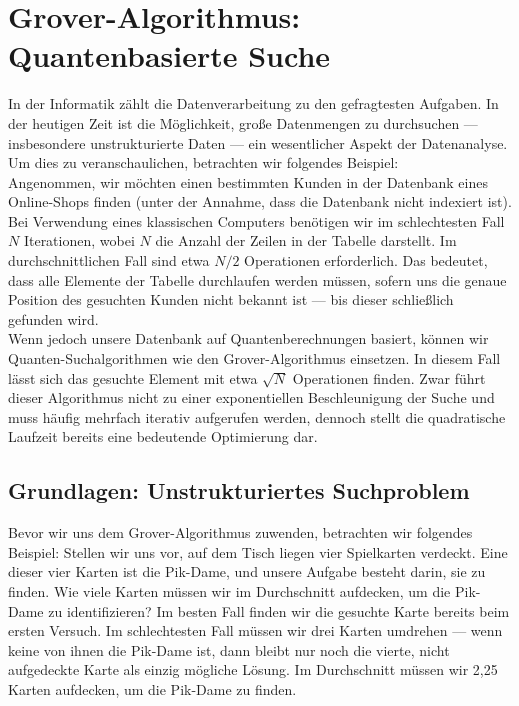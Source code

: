\section{Grover-Algorithmus: Quantenbasierte Suche}
\label{sec:grover-algorithm}
In der Informatik zählt die Datenverarbeitung zu den gefragtesten Aufgaben. In der heutigen Zeit ist die Möglichkeit, große Datenmengen zu durchsuchen — insbesondere unstrukturierte Daten — ein wesentlicher Aspekt der Datenanalyse. Um dies zu veranschaulichen, betrachten wir folgendes Beispiel:\\ 

Angenommen, wir möchten einen bestimmten Kunden in der Datenbank eines Online-Shops finden (unter der Annahme, dass die Datenbank nicht indexiert ist). Bei Verwendung eines klassischen Computers benötigen wir im schlechtesten Fall $N$ Iterationen, wobei $N$ die Anzahl der Zeilen in der Tabelle darstellt. Im durchschnittlichen Fall sind etwa $N/2$ Operationen erforderlich. Das bedeutet, dass alle Elemente der Tabelle durchlaufen werden müssen, sofern uns die genaue Position des gesuchten Kunden nicht bekannt ist — bis dieser schließlich gefunden wird.\\

Wenn jedoch unsere Datenbank auf Quantenberechnungen basiert, können wir Quanten-Suchalgorithmen wie den Grover-Algorithmus einsetzen. In diesem Fall lässt sich das gesuchte Element mit etwa $\sqrt{N}$ Operationen finden. Zwar führt dieser Algorithmus nicht zu einer exponentiellen Beschleunigung der Suche und muss häufig mehrfach iterativ aufgerufen werden, dennoch stellt die quadratische Laufzeit bereits eine bedeutende Optimierung dar.

\subsection{Grundlagen: Unstrukturiertes Suchproblem}
Bevor wir uns dem Grover-Algorithmus zuwenden, betrachten wir folgendes Beispiel: Stellen wir uns vor, auf dem Tisch liegen vier Spielkarten verdeckt. Eine dieser vier Karten ist die Pik-Dame, und unsere Aufgabe besteht darin, sie zu finden. Wie viele Karten müssen wir im Durchschnitt aufdecken, um die Pik-Dame zu identifizieren? Im besten Fall finden wir die gesuchte Karte bereits beim ersten Versuch. Im schlechtesten Fall müssen wir drei Karten umdrehen — wenn keine von ihnen die Pik-Dame ist, dann bleibt nur noch die vierte, nicht aufgedeckte Karte als einzig mögliche Lösung. Im Durchschnitt müssen wir 2{,}25 Karten aufdecken, um die Pik-Dame zu finden.\\


